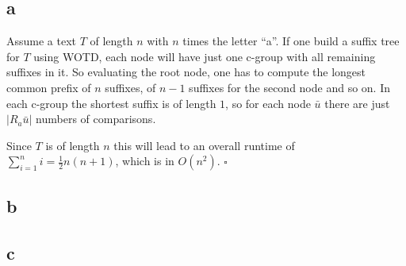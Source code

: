 \documentclass[%
   10pt,              %
   ngerman,           %
   a4paper,           %
   DIV11,             %
]{scrartcl}%
\begin{document}
\subsection*{a}
Assume a text $T$ of length $n$ with $n$ times the letter ``a''. If one build a suffix tree for $T$ 
using WOTD, each node will have just one c-group with all remaining suffixes in it. So evaluating the 
root node, one has to compute the longest common prefix of $n$ suffixes, of $n-1$ suffixes for the 
second node and so on. In each c-group the shortest suffix is of length $1$, so for each node $\bar{u}$ 
there are just $|R_a{\bar{u}}|$ numbers of comparisons.

Since $T$ is of length $n$ this will lead to an overall runtime of $\sum_{i=1}^{n}i = \frac{1}{2}n(n+1)$, 
which is in $O(n^2)$. $\square$


\subsection*{b}


\subsection*{c}
\end{document}

